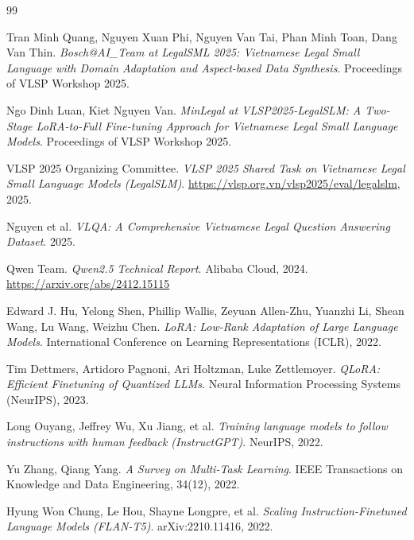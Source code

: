 \documentclass[fontsize=13pt,a4paper,oneside,DIV=calc,chapterprefix=true]{scrbook}
\begin{document}

\begin{thebibliography}{99}

Tran Minh Quang, Nguyen Xuan Phi, Nguyen Van Tai, Phan Minh Toan, Dang Van Thin.
\textit{Bosch@AI\_Team at LegalSML 2025: Vietnamese Legal Small Language with Domain Adaptation
and Aspect-based Data Synthesis}.
Proceedings of VLSP Workshop 2025.

Ngo Dinh Luan, Kiet Nguyen Van.
\textit{MinLegal at VLSP2025-LegalSLM: A Two-Stage LoRA-to-Full Fine-tuning Approach for
Vietnamese Legal Small Language Models}.
Proceedings of VLSP Workshop 2025.

VLSP 2025 Organizing Committee.
\textit{VLSP 2025 Shared Task on Vietnamese Legal Small Language Models (LegalSLM)}.
\url{https://vlsp.org.vn/vlsp2025/eval/legalslm}, 2025.

Nguyen et al.
\textit{VLQA: A Comprehensive Vietnamese Legal Question Answering Dataset}.
2025.

Qwen Team.
\textit{Qwen2.5 Technical Report}.
Alibaba Cloud, 2024.
\url{https://arxiv.org/abs/2412.15115}

Edward J. Hu, Yelong Shen, Phillip Wallis, Zeyuan Allen-Zhu, Yuanzhi Li, Shean Wang,
Lu Wang, Weizhu Chen.
\textit{LoRA: Low-Rank Adaptation of Large Language Models}.
International Conference on Learning Representations (ICLR), 2022.

Tim Dettmers, Artidoro Pagnoni, Ari Holtzman, Luke Zettlemoyer.
\textit{QLoRA: Efficient Finetuning of Quantized LLMs}.
Neural Information Processing Systems (NeurIPS), 2023.

Long Ouyang, Jeffrey Wu, Xu Jiang, et al.
\textit{Training language models to follow instructions with human feedback (InstructGPT)}.
NeurIPS, 2022.

Yu Zhang, Qiang Yang.
\textit{A Survey on Multi-Task Learning}.
IEEE Transactions on Knowledge and Data Engineering, 34(12), 2022.

Hyung Won Chung, Le Hou, Shayne Longpre, et al.
\textit{Scaling Instruction-Finetuned Language Models (FLAN-T5)}.
arXiv:2210.11416, 2022.

\end{thebibliography}
\end{document}
